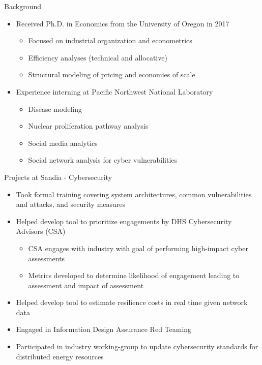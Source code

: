 \documentclass{beamer}
\begin{document}
	
\begin{frame}{Background}
\begin{itemize}
	\item Received Ph.D. in Economics from the University of Oregon in 2017
		\begin{itemize}
			\item Focused on industrial organization and econometrics
			\item Efficiency analyses (technical and allocative)
			\item Structural modeling of pricing and economies of scale
		\end{itemize}
	\item Experience interning at Pacific Northwest National Laboratory
		\begin{itemize}
			\vspace*{-3ex}
			\item Disease modeling
			\item Nuclear proliferation pathway analysis
			\item Social media analytics
			\item Social network analysis for cyber vulnerabilities
		\end{itemize}
\end{itemize}
\end{frame}

\begin{frame}{Projects at Sandia - Cybersecurity}
\begin{itemize}
	\item Took formal training covering system architectures, common vulnerabilities and attacks, and security measures
	\item Helped develop tool to prioritize engagements by DHS Cybersecurity Advisors (CSA)
		\begin{itemize}
			\item CSA engages with industry with goal of performing high-impact cyber assessments
			\item Metrics developed to determine likelihood of engagement leading to assessment and impact of assessment
		\end{itemize}
	\item Helped develop tool to estimate resilience costs in real time given network data
	\item Engaged in Information Design Assurance Red Teaming
	\item Participated in industry working-group to update cybersecurity standards for distributed energy resources
\end{itemize}
\end{frame}
\end{document}
